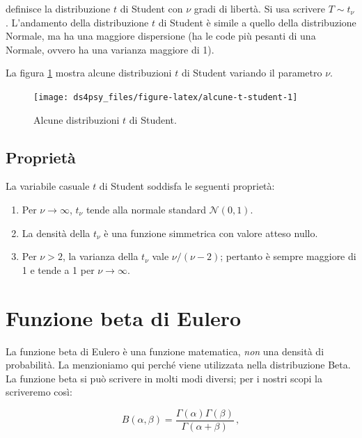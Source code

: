 \documentclass[
  11pt,
]{krantz}
\theoremstyle{definition}
\theoremstyle{definition}
\theoremstyle{definition}
\theoremstyle{definition}
\theoremstyle{remark}
\begin{document}
definisce la distribuzione \(t\) di Student con \(\nu\) gradi di libertà. Si usa scrivere \(T \sim t_{\nu}\). L'andamento della distribuzione \(t\) di Student è simile a quello della distribuzione Normale, ma ha una maggiore dispersione (ha le code più pesanti di una Normale, ovvero ha una varianza maggiore di 1).

La figura \ref{fig:alcune-t-student} mostra alcune distribuzioni \(t\) di Student variando il parametro \(\nu\).

\begin{figure}[h]

{\centering \texttt{[image: ds4psy\_files/figure-latex/alcune-t-student-1]} 

}

\caption{Alcune distribuzioni $t$ di Student.}\label{fig:alcune-t-student}
\end{figure}

\hypertarget{proprietuxe0-2}{%
\subsection{Proprietà}\label{proprietuxe0-2}}

La variabile casuale \(t\) di Student soddisfa le seguenti proprietà:

\begin{enumerate}
\def\labelenumi{\arabic{enumi}.}
\item
  Per \(\nu \rightarrow \infty\), \(t_{\nu}\) tende alla normale standard \(\mathcal{N}(0, 1)\).
\item
  La densità della \(t_{\nu}\) è una funzione simmetrica con valore atteso nullo.
\item
  Per \(\nu > 2\), la varianza della \(t_{\nu}\) vale \(\nu/(\nu - 2)\); pertanto è sempre maggiore di 1 e tende a 1 per \(\nu \rightarrow \infty\).
\end{enumerate}

\hypertarget{funzione-beta-di-eulero}{%
\section{Funzione beta di Eulero}\label{funzione-beta-di-eulero}}

La funzione beta di Eulero è una funzione matematica, \emph{non} una densità di probabilità. La menzioniamo qui perché viene utilizzata nella distribuzione Beta. La funzione beta si può scrivere in molti modi diversi; per i nostri scopi la scriveremo così:

\begin{equation}
B(\alpha, \beta) = \frac{\Gamma(\alpha)\Gamma(\beta)}{\Gamma(\alpha + \beta)}\,,
\end{equation}
\end{document}

